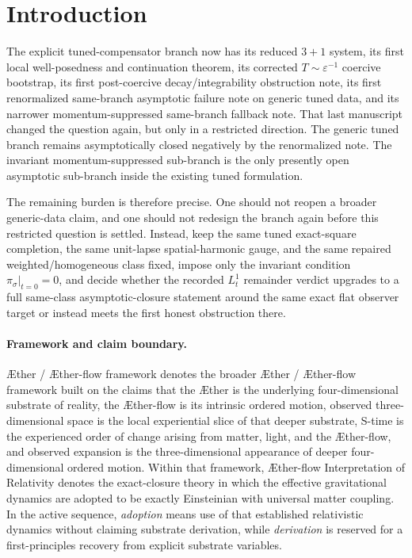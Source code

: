 \documentclass[11pt]{article}
\newcommand{\Aether}{\AE{}ther}
\newcommand{\Aflow}{\AE{}ther-flow}
\newcommand{\TheoryName}{\Aflow{} Interpretation of Relativity}
\newcommand{\TheoryProgram}{\Aether{} / \Aflow{} framework}
\begin{document}
\section{Introduction}

The explicit tuned-compensator branch now has its reduced \(3+1\) system, its first local well-posedness and continuation theorem, its corrected \(T\sim\varepsilon^{-1}\) coercive bootstrap, its first post-coercive decay/integrability obstruction note, its first renormalized same-branch asymptotic failure note on generic tuned data, and its narrower momentum-suppressed same-branch fallback note. That last manuscript changed the question again, but only in a restricted direction. The generic tuned branch remains asymptotically closed negatively by the renormalized note. The invariant momentum-suppressed sub-branch is the only presently open asymptotic sub-branch inside the existing tuned formulation.

The remaining burden is therefore precise. One should not reopen a broader generic-data claim, and one should not redesign the branch again before this restricted question is settled. Instead, keep the same tuned exact-square completion, the same unit-lapse spatial-harmonic gauge, and the same repaired weighted/homogeneous class fixed, impose only the invariant condition \(\pi_\sigma|_{t=0}=0\), and decide whether the recorded \(L_t^1\) remainder verdict upgrades to a full same-class asymptotic-closure statement around the same exact flat observer target or instead meets the first honest obstruction there.

\paragraph{Framework and claim boundary.}
\TheoryProgram{} denotes the broader \Aether{} / \Aflow{} framework built on the claims that the \Aether{} is the underlying four-dimensional substrate of reality, the \Aflow{} is its intrinsic ordered motion, observed three-dimensional space is the local experiential slice of that deeper substrate, S-time is the experienced order of change arising from matter, light, and the \Aflow{}, and observed expansion is the three-dimensional appearance of deeper four-dimensional ordered motion. Within that framework, \TheoryName{} denotes the exact-closure theory in which the effective gravitational dynamics are adopted to be exactly Einsteinian with universal matter coupling. In the active sequence, \emph{adoption} means use of that established relativistic dynamics without claiming substrate derivation, while \emph{derivation} is reserved for a first-principles recovery from explicit substrate variables.
\end{document}
